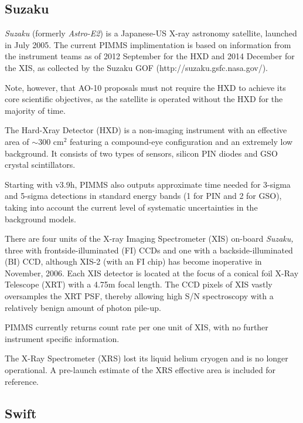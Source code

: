 \subsection{Suzaku}

{\em Suzaku\/} (formerly {\em Astro-E2\/}) is a Japanese-US X-ray astronomy
satellite, launched in July 2005.  The current PIMMS implimentation is based
on information from the instrument teams as of 2012 September for the HXD
and 2014 December for the XIS, as collected by the Suzaku GOF
(http://suzaku.gsfc.nasa.gov/).

Note, however, that AO-10 proposals must not require the HXD to
achieve its core scientific objectives, as the satellite is operated
without the HXD for the majority of time.

The Hard-Xray Detector (HXD) is a non-imaging instrument with an effective
area of $\sim$300 cm$^2$ featuring a compound-eye configuration and an
extremely low background.  It consists of two types of sensors, silicon
PIN diodes and GSO crystal scintillators.

Starting with v3.9h, PIMMS also outputs approximate time needed for
3-sigma and 5-sigma detections in standard energy bands (1 for PIN
and 2 for GSO), taking into account the current level of systematic
uncertainties in the background models.

There are four units of the X-ray Imaging Spectrometer (XIS)
on-board {\em Suzaku,\/}
three with frontside-illuminated (FI) CCDs and one with a backside-illuminated
(BI) CCD, although XIS-2 (with an FI chip) has become inoperative
in November, 2006. Each XIS detector is located at the focus of a conical foil
X-Ray Telescope (XRT) with a 4.75m focal length.  The CCD pixels of XIS
vastly oversamples the XRT PSF, thereby allowing high S/N spectroscopy
with a relatively benign amount of photon pile-up.

PIMMS currently returns count rate per one unit of XIS, with no further
instrument specific information.

The X-Ray Spectrometer (XRS) lost its liquid helium cryogen and
is no longer operational.  A pre-launch estimate of the XRS effective
area is included for reference.

\subsection{Swift}

